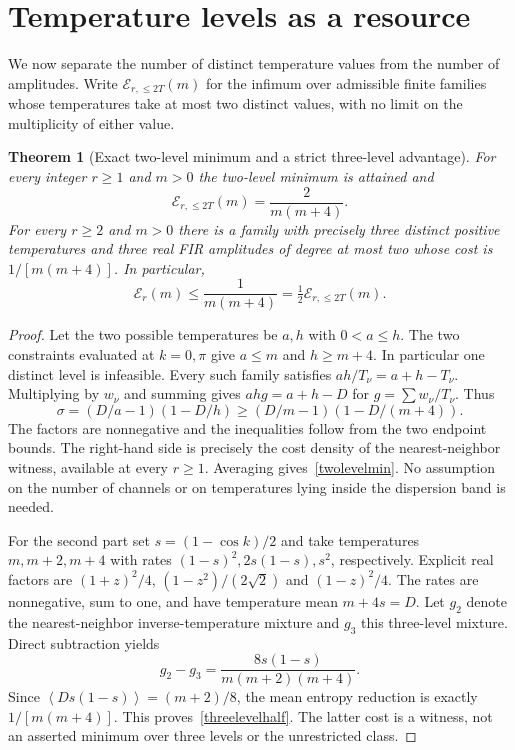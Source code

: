 \documentclass[11pt]{article}
\newtheorem{theorem}{Theorem}
\newcommand{\avg}[1]{\left\langle #1\right\rangle}
\begin{document}
\section{Temperature levels as a resource}\label{temperaturelevels}
We now separate the number of distinct temperature values from the number of amplitudes. Write $\mathcal E_{r,\le2T}(m)$ for the infimum over admissible finite families whose temperatures take at most two distinct values, with no limit on the multiplicity of either value.
\begin{theorem}[Exact two-level minimum and a strict three-level advantage]\label{temperaturethm}
For every integer $r\ge1$ and $m>0$ the two-level minimum is attained and
\begin{equation}\label{twolevelmin}
 \mathcal E_{r,\le2T}(m)=\frac{2}{m(m+4)}.
\end{equation}
For every $r\ge2$ and $m>0$ there is a family with precisely three distinct positive temperatures and three real FIR amplitudes of degree at most two whose cost is $1/[m(m+4)]$. In particular,
\begin{equation}\label{threelevelhalf}
 \mathcal E_r(m)\le\frac{1}{m(m+4)}=\tfrac12\mathcal E_{r,\le2T}(m).
\end{equation}
\end{theorem}
\begin{proof}
Let the two possible temperatures be $a,h$ with $0<a\le h$. The two constraints evaluated at $k=0,\pi$ give $a\le m$ and $h\ge m+4$. In particular one distinct level is infeasible. Every such family satisfies $ah/T_\nu=a+h-T_\nu$. Multiplying by $w_\nu$ and summing gives $ahg=a+h-D$ for $g=\sum w_\nu/T_\nu$. Thus
\[
 \sigma=(D/a-1)(1-D/h)\ge (D/m-1)(1-D/(m+4)).
\]
The factors are nonnegative and the inequalities follow from the two endpoint bounds. The right-hand side is precisely the cost density of the nearest-neighbor witness, available at every $r\ge1$. Averaging gives~\eqref{twolevelmin}. No assumption on the number of channels or on temperatures lying inside the dispersion band is needed.

For the second part set $s=(1-\cos k)/2$ and take temperatures $m,m+2,m+4$ with rates $(1-s)^2,2s(1-s),s^2$, respectively. Explicit real factors are $(1+z)^2/4$, $(1-z^2)/(2\sqrt2)$ and $(1-z)^2/4$. The rates are nonnegative, sum to one, and have temperature mean $m+4s=D$. Let $g_2$ denote the nearest-neighbor inverse-temperature mixture and $g_3$ this three-level mixture. Direct subtraction yields
\[
 g_2-g_3=\frac{8s(1-s)}{m(m+2)(m+4)}.
\]
Since $\avg{Ds(1-s)}=(m+2)/8$, the mean entropy reduction is exactly $1/[m(m+4)]$. This proves~\eqref{threelevelhalf}. The latter cost is a witness, not an asserted minimum over three levels or the unrestricted class.
\end{proof}
\end{document}
